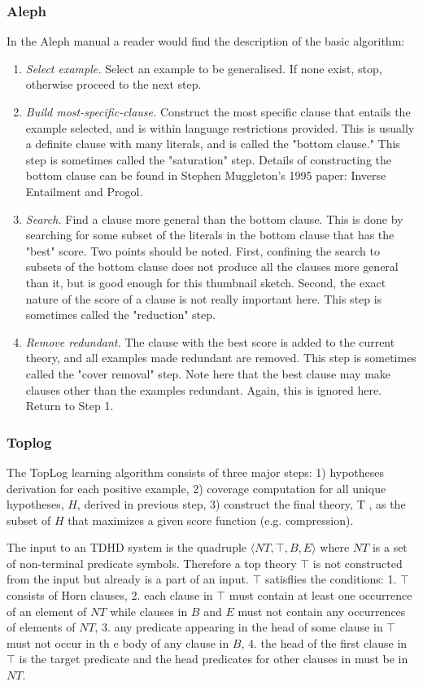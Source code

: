 \subsubsection{Aleph}
In the Aleph manual\cite{aleph2007} a reader would find the description of the basic algorithm:
\begin{enumerate}
\item \emph{Select example.} Select an example to be generalised. If none exist, stop, otherwise proceed to the next step.
\item \emph{Build most-specific-clause.} Construct the most specific clause that entails the example selected, and is within language restrictions provided. This is usually a definite clause with many literals, and is called the "bottom clause." This step is sometimes called the "saturation" step. Details of constructing the bottom clause can be found in Stephen Muggleton's 1995 paper: Inverse Entailment and Progol\cite{muggleton1995inverse}.
\item \emph{Search.} Find a clause more general than the bottom clause. This is done by searching for some subset of the literals in the bottom clause that has the "best" score. Two points should be noted. First, confining the search to subsets of the bottom clause does not produce all the clauses more general than it, but is good enough for this thumbnail sketch. Second, the exact nature of the score of a clause is not really important here. This step is sometimes called the "reduction" step.
\item \emph{Remove redundant.} The clause with the best score is added to the current theory, and all examples made redundant are removed. This step is sometimes called the "cover removal" step. Note here that the best clause may make clauses other than the examples redundant. Again, this is ignored here. Return to Step 1.
\end{enumerate}

\subsubsection{Toplog\cite{muggleton2008toplog}}
The TopLog learning algorithm consists of three major steps: 1) hypotheses
derivation for each positive example, 2) coverage computation for all unique
hypotheses, $H$, derived in previous step, 3) construct the final theory, T , as the
subset of $H$ that maximizes a given score function (e.g. compression).

The input to an TDHD system is the quadruple $\langle NT, \top, B, E \rangle$ where $NT$ is a set of non-terminal  predicate symbols. Therefore a top theory $\top$ is not constructed from the input but already is a part of an input. $\top$ satisflies the conditions:
1. $\top$ consists of Horn clauses,
2. each clause in $\top$
must contain at least one occurrence of an element of $NT$ while clauses in $B$
and $E$ must not contain any occurrences of elements of $NT$,
3. any predicate appearing in the head of some clause in $\top$ must not occur in th	e body of any clause in $B$,
4. the head of the first clause in $\top$ is the target predicate and
the head predicates for other clauses in must be in $NT$.

